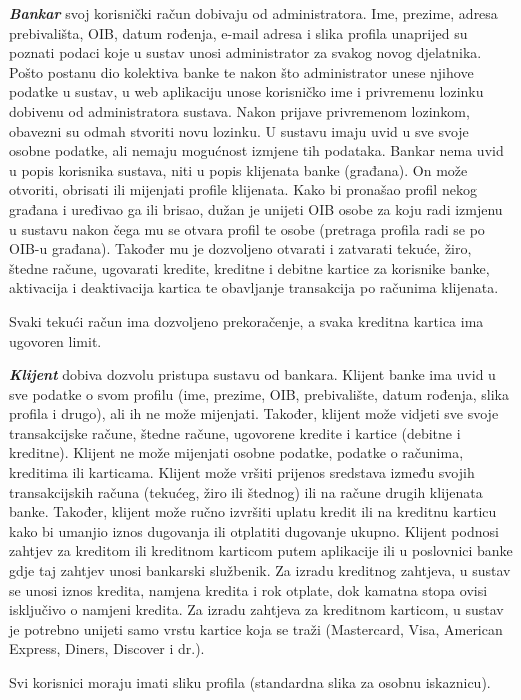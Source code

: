 		\textit{\textbf{Bankar}} svoj korisnički račun dobivaju od administratora. Ime, prezime, adresa prebivališta, OIB, datum rođenja, e-mail adresa i slika profila unaprijed su poznati podaci koje u sustav unosi administrator za svakog novog djelatnika. Pošto postanu dio kolektiva banke te nakon što administrator unese njihove podatke u sustav, u web aplikaciju unose korisničko ime i privremenu lozinku dobivenu od administratora sustava. Nakon prijave privremenom lozinkom, obavezni su odmah stvoriti novu lozinku. U sustavu imaju uvid u sve svoje osobne podatke, ali nemaju mogućnost izmjene tih podataka.
		Bankar nema uvid u popis korisnika sustava, niti u popis klijenata banke (građana). On može otvoriti, obrisati ili mijenjati profile klijenata. Kako bi pronašao profil nekog građana i uređivao ga ili brisao, dužan je unijeti OIB osobe za koju radi izmjenu u sustavu nakon čega mu se otvara profil te osobe (pretraga profila radi se po OIB-u građana). Također mu je dozvoljeno otvarati i zatvarati tekuće, žiro, štedne račune, ugovarati kredite, kreditne i debitne kartice za korisnike banke, aktivacija i deaktivacija kartica te obavljanje transakcija po računima klijenata.
		
		Svaki tekući račun ima dozvoljeno prekoračenje, a svaka kreditna kartica ima ugovoren limit.
		
		\textit{\textbf{Klijent}} dobiva dozvolu pristupa sustavu od bankara. Klijent banke ima uvid u sve podatke o svom profilu (ime, prezime, OIB, prebivalište, datum rođenja, slika profila i drugo), ali ih ne može mijenjati. Također, klijent može vidjeti sve svoje transakcijske račune, štedne račune, ugovorene kredite i kartice (debitne i kreditne). Klijent ne može mijenjati osobne podatke, podatke o računima, kreditima ili karticama. Klijent može vršiti prijenos sredstava između svojih transakcijskih računa (tekućeg, žiro ili štednog) ili na račune drugih klijenata banke. Također, klijent može ručno izvršiti uplatu kredit ili na kreditnu karticu kako bi umanjio iznos dugovanja ili otplatiti dugovanje ukupno.
		Klijent podnosi zahtjev za kreditom ili kreditnom karticom putem aplikacije ili u poslovnici banke gdje taj zahtjev unosi bankarski službenik. Za izradu kreditnog zahtjeva, u sustav se unosi iznos kredita, namjena kredita i rok otplate, dok kamatna stopa ovisi isključivo o namjeni kredita. Za izradu zahtjeva za kreditnom karticom, u sustav je potrebno unijeti samo vrstu kartice koja se traži (Mastercard, Visa, American Express, Diners, Discover i dr.).
		
		Svi korisnici moraju imati sliku profila (standardna slika za osobnu iskaznicu).
		
